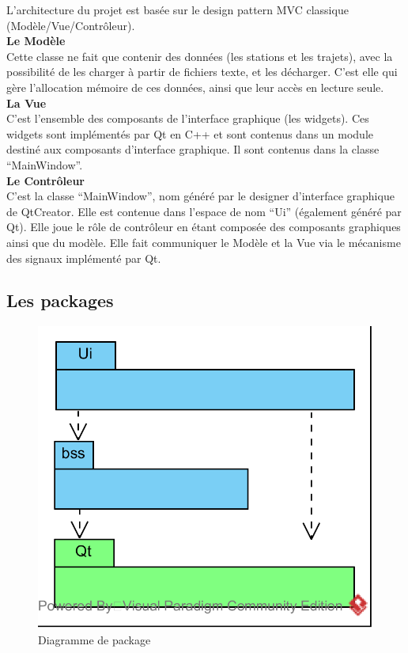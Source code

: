 \documentclass[12pt]{article}
\begin{document}
		L’architecture du projet est basée sur le design pattern MVC classique
		(Modèle/Vue/Contrôleur).\\
		
		\textbf{Le Modèle}\\
		Cette classe ne fait
		que contenir des données (les stations et les trajets), avec la possibilité de les
		charger à partir de fichiers texte, et les décharger. C’est elle qui gère
		l’allocation mémoire de ces données, ainsi que leur accès en lecture seule.\\
		
		\textbf{La Vue}\\
		C’est l’ensemble des composants de l’interface graphique (les widgets). Ces widgets
		sont implémentés par Qt en C++ et sont contenus dans un module destiné aux composants d'interface graphique. Il sont
		contenus dans la classe “MainWindow”.\\
				
		\textbf{Le Contrôleur}\\
		C’est la classe “MainWindow”, nom généré par le designer d’interface graphique de
		QtCreator. Elle est contenue dans l’espace de nom “Ui” (également généré par Qt).
		Elle joue le rôle de contrôleur en étant composée des composants graphiques ainsi que
		du modèle. Elle fait communiquer le Modèle et la Vue via le mécanisme des signaux
		implémenté par Qt.\\
			
		\subsection{Les packages}
		\begin{figure}[!h]
		\begin{center}
		\includegraphics[scale=1]{dia_package.png}
		\caption{Diagramme de package}
		\label{fig:dia_package}
		\end{center}
		\end{figure}		
		
\end{document}
